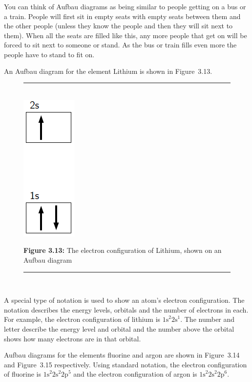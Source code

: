 	\par
      \label{m38741*eip-873}You can think of Aufbau diagrams as being similar to people getting on a bus or a train. People will first sit in empty seats with empty seats between them and the other people (unless they know the people and then they will sit next to them). When all the seats are filled like this, any more people that get on will be forced to sit next to someone or stand. As the bus or train fills even more the people have to stand to fit on. \par \label{m38741*id259728}An Aufbau diagram for the element Lithium is shown in Figure~3.13.\par 
    \setcounter{subfigure}{0}
	\begin{figure}[H] %
    \begin{center}
    \rule[.1in]{\figurerulewidth}{.005in} \\
        \label{m38741*uid101!!!underscore!!!media}\label{m38741*uid101!!!underscore!!!printimage}\includegraphics[width=.9cm]{col11305.imgs/m38741_CG10C3_009.png} %
      \vspace{2pt}
    \vspace{\rubberspace}\par \begin{cnxcaption}
	  \small \textbf{Figure 3.13: }The electron configuration of Lithium, shown on an Aufbau diagram
	\end{cnxcaption}
    \vspace{.1in}
    \rule[.1in]{\figurerulewidth}{.005in} \\
    \end{center}
 \end{figure}       
        \label{m38741*id259749}A special type of notation is used to show an atom's electron configuration. The notation describes the energy levels, orbitals and the number of electrons in each. For example, the electron configuration of lithium is ${1\mathrm{s}}^{2}{2\mathrm{s}}^{1}$. The number and letter describe the energy level and orbital and the number above the orbital shows how many electrons are in that orbital.\par 
        \label{m38741*id259782}Aufbau diagrams for the elements fluorine and argon are shown in Figure~3.14 and Figure~3.15 respectively. Using standard notation, the electron configuration of fluorine is ${1\mathrm{s}}^{2}{2\mathrm{s}}^{2}{2\mathrm{p}}^{5}$ and the electron configuration of argon is ${1\mathrm{s}}^{2}{2\mathrm{s}}^{2}{2\mathrm{p}}^{6}$.\par 
